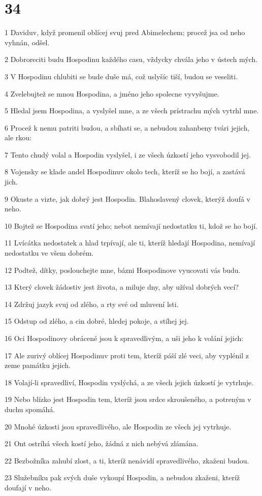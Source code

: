 \chapter{34}

\par 1 Daviduv, když promenil oblícej svuj pred Abimelechem; procež jsa od neho vyhnán, odšel.
\par 2 Dobroreciti budu Hospodinu každého casu, vždycky chvála jeho v ústech mých.
\par 3 V Hospodinu chlubiti se bude duše má, což uslyšíc tiší, budou se veseliti.
\par 4 Zvelebujtež se mnou Hospodina, a jméno jeho spolecne vyvyšujme.
\par 5 Hledal jsem Hospodina, a vyslyšel mne, a ze všech prístrachu mých vytrhl mne.
\par 6 Procež k nemu patriti budou, a sbíhati se, a nebudou zahanbeny tvári jejich, ale rkou:
\par 7 Tento chudý volal a Hospodin vyslyšel, i ze všech úzkostí jeho vysvobodil jej.
\par 8 Vojensky se klade andel Hospodinuv okolo tech, kteríž se ho bojí, a zastává jich.
\par 9 Okuste a vizte, jak dobrý jest Hospodin. Blahoslavený clovek, kterýž doufá v neho.
\par 10 Bojtež se Hospodina svatí jeho; nebot nemívají nedostatku ti, kdož se ho bojí.
\par 11 Lvícátka nedostatek a hlad trpívají, ale ti, kteríž hledají Hospodina, nemívají nedostatku ve všem dobrém.
\par 12 Podtež, dítky, poslouchejte mne, bázni Hospodinove vyucovati vás budu.
\par 13 Který clovek žádostiv jest života, a miluje dny, aby užíval dobrých vecí?
\par 14 Zdržuj jazyk svuj od zlého, a rty své od mluvení lsti.
\par 15 Odstup od zlého, a cin dobré, hledej pokoje, a stíhej jej.
\par 16 Oci Hospodinovy obrácené jsou k spravedlivým, a uši jeho k volání jejich:
\par 17 Ale zurivý oblícej Hospodinuv proti tem, kteríž páší zlé veci, aby vyplénil z zeme památku jejich.
\par 18 Volají-li spravedliví, Hospodin vyslýchá, a ze všech jejich úzkostí je vytrhuje.
\par 19 Nebo blízko jest Hospodin tem, kteríž jsou srdce skroušeného, a potreným v duchu spomáhá.
\par 20 Mnohé úzkosti jsou spravedlivého, ale Hospodin ze všech jej vytrhuje.
\par 21 Ont ostríhá všech kostí jeho, žádná z nich nebývá zlámána.
\par 22 Bezbožníka zahubí zlost, a ti, kteríž nenávidí spravedlivého, zkaženi budou.
\par 23 Služebníku pak svých duše vykoupí Hospodin, a nebudou zkaženi, kteríž doufají v neho.

